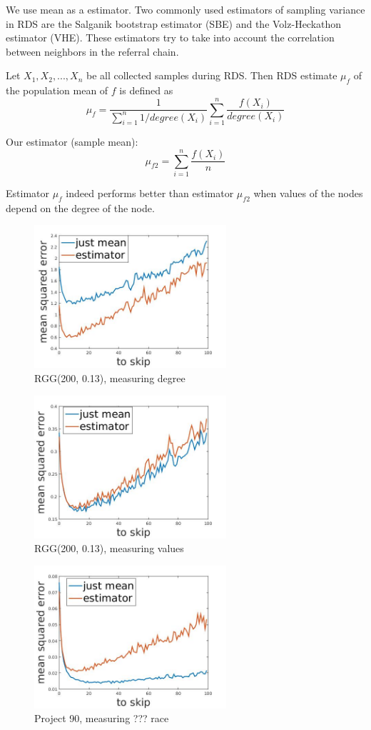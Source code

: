\documentclass[12pt]{report}
\begin{document}
We use mean as a estimator.
Two commonly used estimators of sampling variance in RDS are the Salganik bootstrap estimator (SBE) and the Volz-Heckathon estimator (VHE). These estimators try to take into account the correlation between neighbors in the referral chain.


Let $X_1, X_2, ..., X_n$ be all collected samples during RDS.
Then RDS estimate $\mu_f$ of the population mean of $f$ is defined \cite{goel2010assessing} as
$$\mu_f = \frac{1}{\sum\limits_{i=1}^n 1/degree(X_i)} \sum\limits_{i=1}^n \frac{f(X_i)}{degree(X_i)}$$


Our estimator (sample mean):
$$\mu_{f2} = \sum\limits_{i=1}^n \frac{f(X_i)}{n}$$

Estimator $\mu_f$ indeed performs better than estimator $\mu_{f2}$ when values of the nodes depend on the degree of the node.


\begin{figure}[h]
    \centering
    \includegraphics[height=200px]{RGGdegree}
    \caption{ RGG(200, 0.13), measuring degree}
\end{figure}


\begin{figure}[h]
    \centering
    \includegraphics[height=200px]{RGGfield}
    \caption{ RGG(200, 0.13), measuring values }
\end{figure}


\begin{figure}[h]
    \centering
    \includegraphics[height=200px]{Pr90field}
    \caption{ Project 90, measuring ??? race}
\end{figure}
\end{document}
